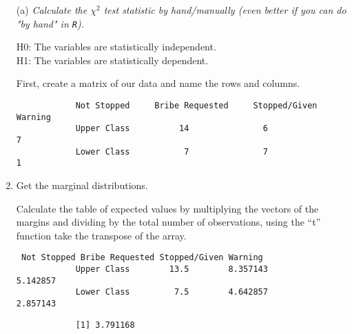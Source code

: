 \documentclass[12pt,letterpaper]{article}
\begin{document}
	\begin{enumerate}
		
		\newpage
		
		\item [(a)]
		\emph{Calculate the $\chi^2$ test statistic by hand/manually (even better if you can do "by hand" in \texttt{R}).}\\
		\vspace{.5cm}
		
		\noindent
		H0: The variables are statistically independent. \\
		H1: The variables are statistically dependent.\\
		\vspace{.5cm}
		
		First, create a matrix of our data and name the rows and columns.
		
		
		\begin{verbatim}  
			Not Stopped     Bribe Requested     Stopped/Given Warning
			Upper Class          14               6                     7
			Lower Class           7               7                     1
		\end{verbatim}
		\vspace{.5cm}
		
		\item Get the marginal distributions.
		
		\vspace{.5cm}
		
		\noindent   
		Calculate the table of expected values by multiplying the vectors of the margins and dividing by the total number of observations, using       the “t” function take the transpose of the array.\\
		
		\begin{verbatim} Not Stopped Bribe Requested Stopped/Given Warning
			Upper Class        13.5        8.357143              5.142857
			Lower Class         7.5        4.642857              2.857143
		\end{verbatim}
		
		
		\vspace{.2cm}
		\begin{verbatim}  
			[1] 3.791168
		\end{verbatim}
		\vspace{.2cm}
		

\end{enumerate}
\end{document}
